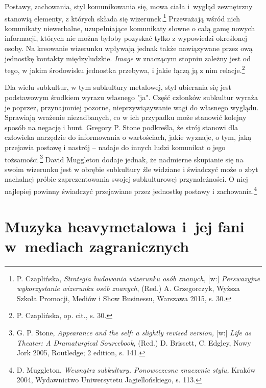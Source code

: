\documentclass[12pt, a4paper, titlepage]{report}
\begin{document}
Postawy, zachowania, styl komunikowania się, mowa ciała i~wygląd zewnętrzny stanowią elementy, z których składa się wizerunek.\footnote{P. Czaplińska, \textit{Strategia budowania wizerunku osób znanych,} [w:] \textit{Perswazyjne wykorzystanie wizerunku osób znanych}, (Red.) A. Grzegorczyk, Wyższa Szkoła Promocji, Mediów i Show Businessu, Warszawa 2015, s. 30.} Przeważają wśród nich komunikaty niewerbalne, uzupełniające komunikaty słowne o całą gamę nowych informacji, których nie można byłoby pozyskać tylko z wypowiedzi określonej osoby. Na kreowanie wizerunku wpływają jednak także nawiązywane przez ową jednostkę kontakty międzyludzkie. \textit{Image} w znaczącym stopniu zależny jest od tego, w jakim środowisku jednostka przebywa, i jakie łączą ją z nim relacje.\footnote{P. Czaplińska, op. cit., s. 30.}


Dla wielu subkultur, w tym subkultury metalowej, styl ubierania się jest podstawowym środkiem wyrazu własnego "ja". Część członków subkultur wyraża je poprzez, przynajmniej pozorne, nieprzywiązywanie wagi do własnego wyglądu. Sprawiają wrażenie niezadbanych, co w ich przypadku może stanowić kolejny sposób na negację i bunt. Gregory P. Stone podkreśla, że strój stanowi dla człowieka narzędzie do informowania o wartościach, jakie wyznaje, o tym, jaką przejawia postawę i nastrój -- nadaje do innych ludzi komunikat o jego tożsamości.\footnote{G. P. Stone, \textit{Appearance and the self: a slightly revised version,} [w:] \textit{Life as Theater: A Dramaturgical Sourcebook,} (Red.) D. Brissett, C. Edgley,  Nowy Jork 2005, Routledge; 2 edition, s. 141.} David Muggleton dodaje jednak, że nadmierne skupianie się na swoim wizerunku jest w obrębie subkultury źle widziane i świadczyć może o zbyt nachalnej próbie zaprezentowania swojej subkulturowej przynależności. O niej najlepiej powinny świadczyć przejawiane przez jednostkę postawy i zachowania.\footnote{D. Muggleton, \textit{Wewnątrz subkultury. Ponowoczesne znaczenie stylu,} Kraków 2004, Wydawnictwo Uniwersytetu Jagiellońskiego, s. 113.}

\section{Muzyka heavymetalowa i~jej fani w~mediach zagranicznych}
\end{document}
